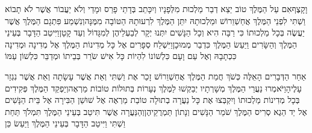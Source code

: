 \documentclass[../main/main.tex]{subfiles}
\begin{document}
\begin{multicols}{\ncols}
וָקָצֶף\PreVerseSpace{}אִם עַל הַמֶּלֶךְ טוֹב יֵצֵא דְבַר מַלְכוּת מִלְּפָנָיו וְיִכָּתֵב בְּדָתֵי פָרַס וּמָדַי וְלֹא יַעֲבוֹר אֲשֶׁר לֹא תָבוֹא וַשְׁתִּי לִפְנֵי הַמֶּלֶךְ אֲחַשְׁוֵרוֹשׁ וּמַלְכוּתָהּ יִתֵּן הַמֶּלֶךְ לִרְעוּתָהּ הַטּוֹבָה מִמֶּנָּה\PreVerseSpace{}וְנִשְׁמַע פִּתְגָם הַמֶּלֶךְ אֲשֶׁר יַעֲשֶׂה בְּכָל מַלְכוּתוֹ כִּי רַבָּה הִיא וְכָל הַנָּשִׁים יִתְּנוּ יְקָר לְבַעְלֵיהֶן לְמִגָּדוֹל וְעַד קָטָן\PreVerseSpace{}וַיִּיטַב הַדָּבָר בְּעֵינֵי הַמֶּלֶךְ וְהַשָּׂרִים וַיַּעַשׂ הַמֶּלֶךְ כִּדְבַר מְמוּכָן\PreVerseSpace{}וַיִּשְׁלַח סְפָרִים אֶל כָּל מְדִינוֹת הַמֶּלֶךְ אֶל מְדִינָה וּמְדִינָה כִּכְתָבָהּ וְאֶל עַם וָעָם כִּלְשׁוֹנוֹ לִהְיוֹת כָּל אִישׁ שֹׂרֵר בְּבֵיתוֹ וּמְדַבֵּר כִּלְשׁוֹן עַמּוֹ\OpenSection{}\par
{}אַחַר הַדְּבָרִים הָאֵלֶּה כְּשֹׁךְ חֲמַת הַמֶּלֶךְ אֲחַשְׁוֵרוֹשׁ זָכַר אֶת וַשְׁתִּי וְאֵת אֲשֶׁר עָשָׂתָה וְאֵת אֲשֶׁר נִגְזַר עָלֶיהָ\PreVerseSpace{}וַיֹּאמְרוּ נַעֲרֵי הַמֶּלֶךְ מְשָׁרְתָיו יְבַקְשׁוּ לַמֶּלֶךְ נְעָרוֹת בְּתוּלוֹת טוֹבוֹת מַרְאֶה\PreVerseSpace{}וְיַפְקֵד הַמֶּלֶךְ פְּקִידִים בְּכָל מְדִינוֹת מַלְכוּתוֹ וְיִקְבְּצוּ אֶת כָּל נַעֲרָה בְתוּלָה טוֹבַת מַרְאֶה אֶל שׁוּשַׁן הַבִּירָה אֶל בֵּית הַנָּשִׁים אֶל יַד הֵגֶא סְרִיס הַמֶּלֶךְ שֹׁמֵר הַנָּשִׁים וְנָתוֹן תַּמְרֻקֵיהֶן\PreVerseSpace{}וְהַנַּעֲרָה אֲשֶׁר תִּיטַב בְּעֵינֵי הַמֶּלֶךְ תִּמְלֹךְ תַּחַת וַשְׁתִּי וַיִּיטַב הַדָּבָר בְּעֵינֵי הַמֶּלֶךְ וַיַּעַשׂ כֵּן\OpenSection{}\par

\end{multicols}
\end{document}
